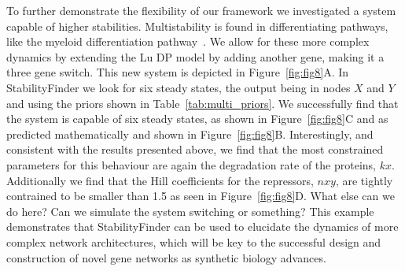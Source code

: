 To further demonstrate the flexibility of our framework we investigated a system capable of higher stabilities. Multistability is found in differentiating pathways, like the myeloid differentiation pathway~\autocite{Ghaffarizadeh:2014bt, Cinquin:2005go}. We allow for these more complex dynamics by extending the Lu DP model by adding another gene, making it a three gene switch.  This new system is depicted in Figure~\ref{fig:fig8}A. In StabilityFinder we look for six steady states, the output being in nodes $X$ and $Y$ and using the priors shown in Table~\ref{tab:multi_priors}. We successfully find that the system is capable of six steady states, as shown in Figure~\ref{fig:fig8}C and as predicted mathematically and shown in Figure~\ref{fig:fig8}B. Interestingly, and consistent with the results presented above, we find that the most constrained parameters for this behaviour are again the degradation rate of the proteins, $kx$. Additionally we find that the Hill coefficients for the repressors, $nxy$, are tightly contrained to be smaller than 1.5 as seen in Figure~\ref{fig:fig8}D. {\color{red} What else can we do here? Can we simulate the system switching or something?} This example demonstrates that StabilityFinder can be used to elucidate the dynamics of more complex network architectures, which will be key to the successful design and construction of novel gene networks as synthetic biology advances.

